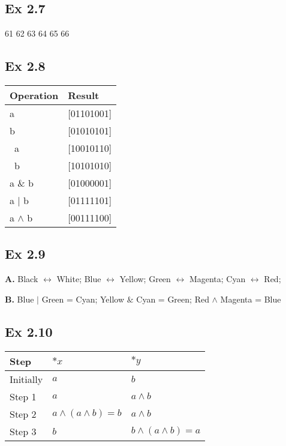 \subsection{Ex 2.7}
61 62 63 64 65 66

\subsection{Ex 2.8}
\begin{table}[h]
    \centering
    \begin{tabular}{ll}
        \toprule
        Operation & Result\\
        \midrule
        a & [01101001]\\
        b & [01010101]\\
        ~a & [10010110]\\
        ~b & [10101010]\\
        a $\&$ b & [01000001]\\
        a $|$ b & [01111101]\\
        a $\land$ b & [00111100]\\
        \bottomrule
    \end{tabular}
\end{table}

\subsection{Ex 2.9}
\textbf{A.} Black $\leftrightarrow$ White; Blue $\leftrightarrow$ Yellow; Green $\leftrightarrow$ Magenta; Cyan $\leftrightarrow$ Red;\par \noindent
\textbf{B.} Blue $|$ Green = Cyan; Yellow $\&$ Cyan = Green; Red $\land$ Magenta = Blue

\subsection{Ex 2.10}
\begin{table}[h]
    \centering
    \begin{tabular}{lll}
        \toprule
        Step & $*x$ & $*y$ \\
        \midrule
        Initially & $a$ & $b$\\
        Step 1 & $a$ & $a \land b$\\
        Step 2 & $a \land (a \land b) = b$ & $a \land b$\\
        Step 3 & $b$ & $b \land (a \land b) = a$ \\
        \bottomrule
    \end{tabular}
\end{table}

